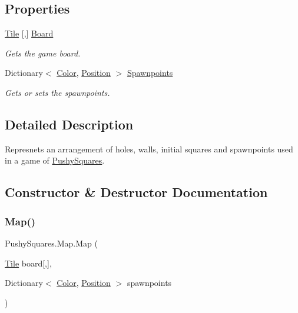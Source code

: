 \subsection*{Properties}
\begin{DoxyCompactItemize}
\item 
\hyperlink{namespace_pushy_squares_a99b558ed55fb7c5c20e9fe37c652132c}{Tile} \mbox{[},\mbox{]} \hyperlink{struct_pushy_squares_1_1_map_a3c11187234afb489b5a30f4c32cd1a14}{Board}
\begin{DoxyCompactList}\small\item\em Gets the game board. \end{DoxyCompactList}\item 
Dictionary$<$ \hyperlink{namespace_pushy_squares_a456c990da0c8e2089c171d31f7e27574}{Color}, \hyperlink{struct_pushy_squares_1_1_position}{Position} $>$ \hyperlink{struct_pushy_squares_1_1_map_a72e3082cfaee94b86c3a1b02f5bda0e9}{Spawnpoints}
\begin{DoxyCompactList}\small\item\em Gets or sets the spawnpoints. \end{DoxyCompactList}\end{DoxyCompactItemize}


\subsection{Detailed Description}
Represnets an arrangement of holes, walls, initial squares and spawnpoints used in a game of \hyperlink{namespace_pushy_squares}{Pushy\+Squares}. 



\subsection{Constructor \& Destructor Documentation}
\mbox{\label{struct_pushy_squares_1_1_map_aa1b0c05acd50a2f77f48f6d07de19afb}} 
\subsubsection{\texorpdfstring{Map()}{Map()}\hspace{0.1cm}{\footnotesize\ttfamily [1/2]}}
{\footnotesize\ttfamily Pushy\+Squares.\+Map.\+Map (\begin{DoxyParamCaption}\item[{\hyperlink{namespace_pushy_squares_a99b558ed55fb7c5c20e9fe37c652132c}{Tile}}]{board\mbox{[},\mbox{]},  }\item[{Dictionary$<$ \hyperlink{namespace_pushy_squares_a456c990da0c8e2089c171d31f7e27574}{Color}, \hyperlink{struct_pushy_squares_1_1_position}{Position} $>$}]{spawnpoints }\end{DoxyParamCaption})}



